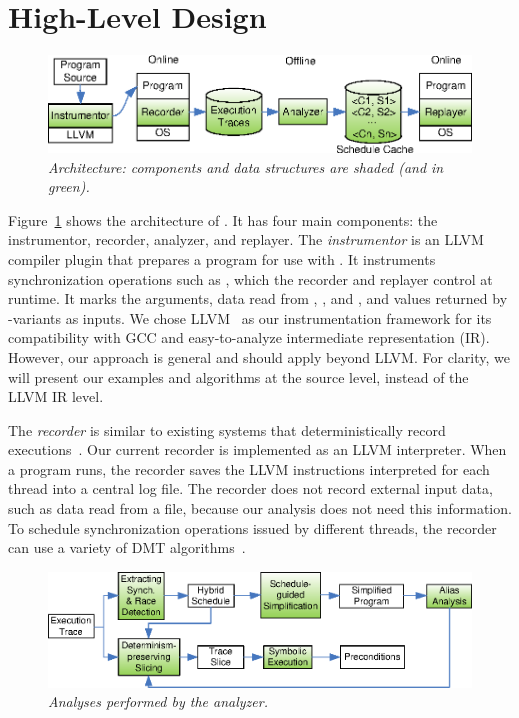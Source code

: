 \section{High-Level Design} \label{sec:peregrine-design}

\begin{figure}[t]
\centering
\includegraphics[width=.96\columnwidth]{peregrine/figures/overview.eps}
\caption{{\em \peregrine Architecture: components and data structures are
    shaded (and in green).}}\label{fig:peregrine-arch}
\end{figure}


Figure~\ref{fig:peregrine-arch} shows the architecture of \peregrine.  It has four main
components: the instrumentor, recorder, analyzer, and
replayer.  The \emph{instrumentor} is an LLVM~\cite{llvm} compiler plugin
that prepares a program for use with \peregrine.  It instruments synchronization
operations such as , which the recorder and
replayer control at runtime.  It marks the  arguments, data read
from , , and , and values
returned by -variants as
inputs.  We chose LLVM~\cite{llvm} as our instrumentation framework for
its compatibility with GCC and easy-to-analyze intermediate representation
(IR).  However, our approach is general and should apply beyond LLVM.
For clarity, we will present our examples and algorithms at the
source level, instead of the LLVM IR level.

The \emph{recorder} is similar to existing systems that deterministically
record executions~\cite{scribe:sigmetrics10,idna:vee06,smp-revirt:vee08}.
Our current recorder is implemented as an LLVM interpreter.  When a
program runs, the recorder saves the LLVM instructions interpreted for
each thread into a central log file.  The recorder does not record
external input data, such as data read from a file, because our
analysis does not need this information.  To schedule synchronization
operations issued by different threads, the recorder can use a variety of
DMT algorithms~\cite{cui:tern:osdi10}.  


\begin{figure}
\centering
\includegraphics[width=\columnwidth]{peregrine/figures/analyzer.eps}
\caption{{\em Analyses performed by the analyzer.}}\label{fig:peregrine-analyzer}
\end{figure}

